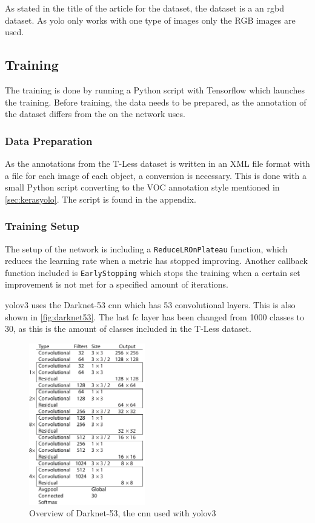 As stated in the title of the article for the dataset, the dataset is a an \gls{rgbd} dataset. As \gls{yolo} only works with one type of images only the RGB images are used.

\subsection{Training}
The training is done by running a Python script with Tensorflow which launches the training. Before training, the data needs to be prepared, as the annotation of the dataset differs from the on the network uses.
\subsubsection{Data Preparation}
As the annotations from the T-Less dataset is written in an XML file format with a file for each image of each object, a conversion is necessary. This is done with a small Python script converting to the VOC annotation style mentioned in \autoref{sec:kerasyolo}. The script is found in the appendix. 

\subsubsection{Training Setup}
The setup of the network is including a \lstinline{ReduceLROnPlateau} function, which reduces the learning rate when a metric has stopped improving. Another callback function included is \lstinline{EarlyStopping} which stops the training when a certain set improvement is not met for a specified amount of iterations.

\gls{yolo}v3 uses the Darknet-53 \gls{cnn} which has 53 convolutional layers. This is also shown in \autoref{fig:darknet53}. The last \gls{fc} layer has been changed from 1000 classes to 30, as this is the amount of classes included in the T-Less dataset.

\begin{figure}[H]
	\centering
	\includegraphics[width=0.45\textwidth]{figures/darknet53}
	\caption{Overview of Darknet-53, the \gls{cnn} used with \gls{yolo}v3 \citep{Redmon2018}}
	\label{fig:darknet53}
\end{figure}


